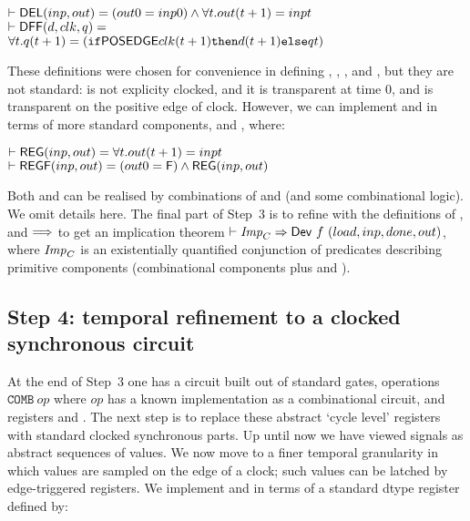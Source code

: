 \vspace*{-2mm}

{\begin{alltt}
\( \vdash \DEF{DEL}(inp,out) = (out 0 = inp 0) \wedge {\forall}t. out(t+1) = inp t                       \)
\( \vdash \DEF{DFF}(d,clk,q) =                                                                           \)
\(     {\forall}t. q(t+1) = (\texttt{if} \DEF{POSEDGE} clk (t+1) \texttt{then} d(t+1) \texttt{else} q t) \)
\end{alltt}}

\vspace*{-2mm}

These definitions were chosen for convenience in defining
, , ,  and , but they are not standard:
 is not explicity clocked, and it is transparent at time $0$,
and
 is transparent on the positive edge of clock. 
However, we can implement  and  in terms of more
standard components,   and , where:

{\baselineskip16pt\begin{alltt}
\( \vdash \DEF{REG}(inp,out) = {\forall}t. out(t+1) = inp t          \)
\( \vdash \DEF{REGF}(inp,out) = (out 0 = \DEF{F}) \wedge \DEF{REG}(inp,out)\)
\end{alltt}}

Both  and  can be realised by combinations of
 and  (and some combinational logic). We omit
details here. The final part of Step~3 is to refine with the
definitions of ,  and $\Longrightarrow$ to get an implication
theorem $\vdash {\it{Imp}}_C \Rightarrow \mathsf{Dev}~f~(load,inp,done,out)$, where ${\it{Imp}}_C$
is an existentially quantified conjunction of predicates describing
primitive components (combinational components plus  and
).

\vspace*{-3mm}

\subsection*{Step 4: temporal refinement to a clocked synchronous circuit}

At the end of Step~3 one has a circuit built out of standard gates,
operations $\texttt{COMB}~op$ where $op$ has a known implementation as
a combinational circuit, and registers  and .  The
next step is to replace these abstract `cycle level' registers with
standard clocked synchronous parts. Up until now we have viewed
signals as abstract sequences of values.  We now move to a finer
temporal granularity in which values are sampled on the edge of a
clock; such values can be latched by edge-triggered registers. We
implement  and  in terms of a standard dtype
register defined by:

